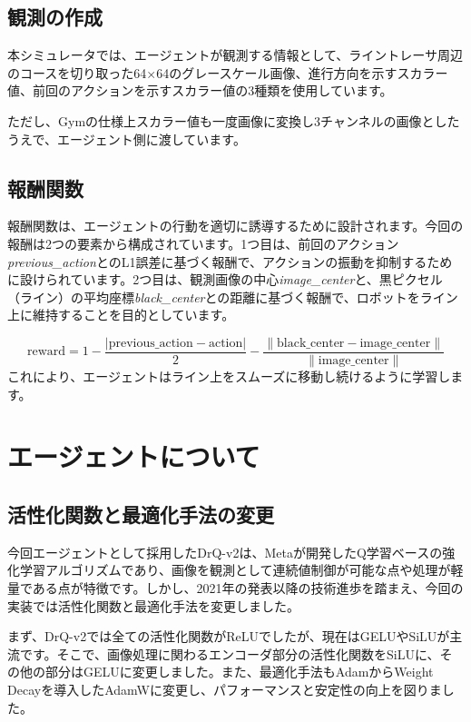 \subsection{観測の作成}
本シミュレータでは、エージェントが観測する情報として、ライントレーサ周辺のコースを切り取った64×64のグレースケール画像、進行方向を示すスカラー値、前回のアクションを示すスカラー値の3種類を使用しています。

ただし、Gymの仕様上スカラー値も一度画像に変換し3チャンネルの画像としたうえで、エージェント側に渡しています。

\subsection{報酬関数}
報酬関数は、エージェントの行動を適切に誘導するために設計されます。今回の報酬は2つの要素から構成されています。1つ目は、前回のアクション\textit{previous\_action}とのL1誤差に基づく報酬で、アクションの振動を抑制するために設けられています。2つ目は、観測画像の中心\textit{image\_center}と、黒ピクセル（ライン）の平均座標\textit{black\_center}との距離に基づく報酬で、ロボットをライン上に維持することを目的としています。

\[
\text{reward} = 1 - \frac{| \text{previous\_action} - \text{action} |}{2} - \frac{\| \text{black\_center} - \text{image\_center} \|}{\| \text{image\_center} \|}
\]
これにより、エージェントはライン上をスムーズに移動し続けるように学習します。

\section{エージェントについて}

\subsection{活性化関数と最適化手法の変更}
今回エージェントとして採用したDrQ-v2\cite{yarats2021masteringvisualcontinuouscontrol}は、Metaが開発したQ学習ベースの強化学習アルゴリズムであり、画像を観測として連続値制御が可能な点や処理が軽量である点が特徴です。しかし、2021年の発表以降の技術進歩を踏まえ、今回の実装では活性化関数と最適化手法を変更しました。

まず、DrQ-v2では全ての活性化関数がReLUでしたが、現在はGELUやSiLUが主流です。そこで、画像処理に関わるエンコーダ部分の活性化関数をSiLUに、その他の部分はGELUに変更しました。また、最適化手法もAdamからWeight Decayを導入したAdamWに変更し、パフォーマンスと安定性の向上を図りました。

